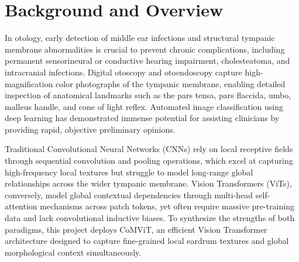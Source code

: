 \documentclass[12pt,a4paper]{report}
\renewcommand{\textbf}[1]{#1}
\begin{document}
\section{Background and Overview}
In otology, early detection of middle ear infections and structural tympanic membrane abnormalities is crucial to prevent chronic complications, including permanent sensorineural or conductive hearing impairment, cholesteatoma, and intracranial infections. Digital otoscopy and otoendoscopy capture high-magnification color photographs of the tympanic membrane, enabling detailed inspection of anatomical landmarks such as the pars tensa, pars flaccida, umbo, malleus handle, and cone of light reflex. Automated image classification using deep learning has demonstrated immense potential for assisting clinicians by providing rapid, objective preliminary opinions.

Traditional Convolutional Neural Networks (CNNs) rely on local receptive fields through sequential convolution and pooling operations, which excel at capturing high-frequency local textures but struggle to model long-range global relationships across the wider tympanic membrane. Vision Transformers (ViTs), conversely, model global contextual dependencies through multi-head self-attention mechanisms across patch tokens, yet often require massive pre-training data and lack convolutional inductive biases. To synthesize the strengths of both paradigms, this project deploys \textbf{CoMViT}, an efficient Vision Transformer architecture designed to capture fine-grained local eardrum textures and global morphological context simultaneously.
\end{document}

